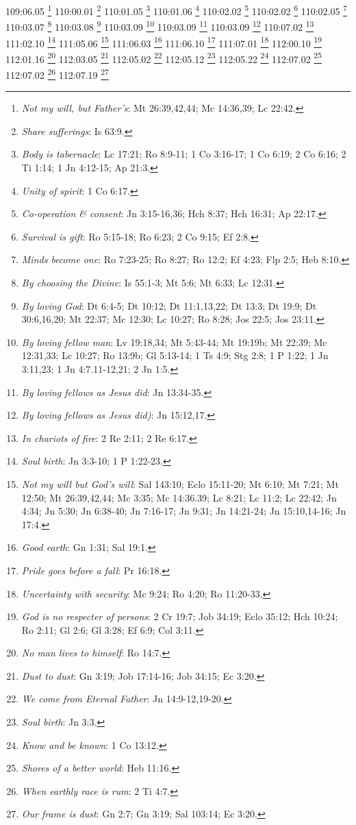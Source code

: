 {{109:06.05 \footnote{\textit{Not my will, but Father's}: Mt 26:39,42,44; Mc 14:36,39; Lc 22:42.}
110:00.01 \footnote{\textit{Share sufferings}: Is 63:9.}
110:01.05 \footnote{\textit{Body is tabernacle}: Lc 17:21; Ro 8:9-11; 1 Co 3:16-17; 1 Co 6:19; 2 Co 6:16; 2 Ti 1:14; 1 Jn 4:12-15; Ap 21:3.}
110:01.06 \footnote{\textit{Unity of spirit}: 1 Co 6:17.}
110:02.02 \footnote{\textit{Co-operation & consent}: Jn 3:15-16,36; Hch 8:37; Hch 16:31; Ap 22:17.}
110:02.02 \footnote{\textit{Survival is gift}: Ro 5:15-18; Ro 6:23; 2 Co 9:15; Ef 2:8.}
110:02.05 \footnote{\textit{Minds become one}: Ro 7:23-25; Ro 8:27; Ro 12:2; Ef 4:23; Flp 2:5; Heb 8:10.}
110:03.07 \footnote{\textit{By choosing the Divine}: Is 55:1-3; Mt 5:6; Mt 6:33; Lc 12:31.}
110:03.08 \footnote{\textit{By loving God}: Dt 6:4-5; Dt 10:12; Dt 11:1,13,22; Dt 13:3; Dt 19:9; Dt 30:6,16,20; Mt 22:37; Mc 12:30; Lc 10:27; Ro 8:28; Jos 22:5; Jos 23:11.}
110:03.09 \footnote{\textit{By loving fellow man}: Lv 19:18,34; Mt 5:43-44; Mt 19:19b; Mt 22:39; Mc 12:31,33; Lc 10:27; Ro 13:9b; Gl 5:13-14; 1 Ts 4:9; Stg 2:8; 1 P 1:22; 1 Jn 3:11,23; 1 Jn 4:7.11-12,21; 2 Jn 1:5.}
110:03.09 \footnote{\textit{By loving fellows as Jesus did}: Jn 13:34-35.}
110:03.09 \footnote{\textit{By loving fellows as Jesus did)}: Jn 15:12,17.}
110:07.02 \footnote{\textit{In chariots of fire}: 2 Re 2:11; 2 Re 6:17.}
111:02.10 \footnote{\textit{Soul birth}: Jn 3:3-10; 1 P 1:22-23.}
111:05.06 \footnote{\textit{Not my will but God's will}: Sal 143:10; Eclo 15:11-20; Mt 6:10; Mt 7:21; Mt 12:50; Mt 26:39,42,44; Mc 3:35; Mc 14:36.39; Lc 8:21; Lc 11:2; Lc 22:42; Jn 4:34; Jn 5:30; Jn 6:38-40; Jn 7:16-17; Jn 9:31; Jn 14:21-24; Jn 15:10,14-16; Jn 17:4.}
111:06.03 \footnote{\textit{Good earth}: Gn 1:31; Sal 19:1.}
111:06.10 \footnote{\textit{Pride goes before a fall}: Pr 16:18.}
111:07.01 \footnote{\textit{Uncertainty with security}: Mc 9:24; Ro 4:20; Ro 11:20-33.}
112:00.10 \footnote{\textit{God is no respecter of persons}: 2 Cr 19:7; Job 34:19; Eclo 35:12; Hch 10:24; Ro 2:11; Gl 2:6; Gl 3:28; Ef 6:9; Col 3:11.}
112:01.16 \footnote{\textit{No man lives to himself}: Ro 14:7.}
112:03.05 \footnote{\textit{Dust to dust}: Gn 3:19; Job 17:14-16; Job 34:15; Ec 3:20.}
112:05.02 \footnote{\textit{We come from Eternal Father}: Jn 14:9-12,19-20.}
112:05.12 \footnote{\textit{Soul birth}: Jn 3:3.}
112:05.22 \footnote{\textit{Know and be known}: 1 Co 13:12.}
112:07.02 \footnote{\textit{Shores of a better world}: Heb 11:16.}
112:07.02 \footnote{\textit{When earthly race is rum}: 2 Ti 4:7.}
112:07.19 \footnote{\textit{Our frame is dust}: Gn 2:7; Gn 3:19; Sal 103:14; Ec 3:20.}
}}
